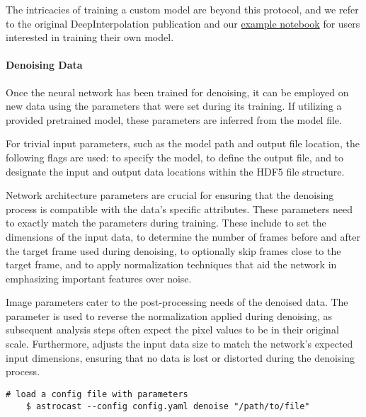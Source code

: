 The intricacies of training a custom model are beyond this protocol, and we refer to the original DeepInterpolation
publication\citep{lecoq_removing_2021} and our \href{https://github.com/janreising/astroCAST/blob/1066d1a9787111bf19ac3dff8894d931f62a13ee/notebooks/examples/train_a_denoiser_model.ipynb}{example notebook} for users interested in training their own model.

\paragraph{Denoising Data}
Once the neural network has been trained for denoising, it can be employed on new data using the parameters that were set during its training. If utilizing a provided pretrained model, these parameters are inferred from the model file.

For trivial input parameters, such as the model path and output file location, the following flags are used:  to specify the model,  to define the output file,  and  to designate the input and output data locations within the HDF5 file structure.

Network architecture parameters are crucial for ensuring that the denoising process is compatible with the data's specific attributes. These parameters need to exactly match the parameters during training. These include  to set the dimensions of the input data,  to determine the number of frames before and after the target frame used during denoising,  to optionally skip frames close to the target frame, and  to apply normalization techniques that aid the network in emphasizing important features over noise.

Image parameters cater to the post-processing needs of the denoised data. The  parameter is used to reverse the normalization applied during denoising, as subsequent analysis steps often expect the pixel values to be in their original scale. Furthermore,  adjusts the input data size to match the network's expected input dimensions, ensuring that no data is lost or distorted during the denoising process.

\begin{lstlisting}[style=bashStyle]
    # load a config file with parameters
    $ astrocast --config config.yaml denoise "/path/to/file"
\end{lstlisting}

